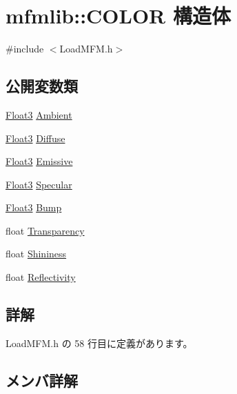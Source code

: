 \hypertarget{structmfmlib_1_1_c_o_l_o_r}{}\section{mfmlib\+:\+:C\+O\+L\+OR 構造体}
\label{structmfmlib_1_1_c_o_l_o_r}


{\ttfamily \#include $<$Load\+M\+F\+M.\+h$>$}

\subsection*{公開変数類}
\begin{DoxyCompactItemize}
\item 
\mbox{\hyperlink{structmfmlib_1_1_float3}{Float3}} \mbox{\hyperlink{structmfmlib_1_1_c_o_l_o_r_a66a6ab53ba9f59038bb853b5cb2bcee3}{Ambient}}
\item 
\mbox{\hyperlink{structmfmlib_1_1_float3}{Float3}} \mbox{\hyperlink{structmfmlib_1_1_c_o_l_o_r_a1c67c1a239b12b2896e07a19643ecf95}{Diffuse}}
\item 
\mbox{\hyperlink{structmfmlib_1_1_float3}{Float3}} \mbox{\hyperlink{structmfmlib_1_1_c_o_l_o_r_a179a172e0911c311ce7f5292f428897a}{Emissive}}
\item 
\mbox{\hyperlink{structmfmlib_1_1_float3}{Float3}} \mbox{\hyperlink{structmfmlib_1_1_c_o_l_o_r_a6f8590c510c471fb9bfe748c113d86d0}{Specular}}
\item 
\mbox{\hyperlink{structmfmlib_1_1_float3}{Float3}} \mbox{\hyperlink{structmfmlib_1_1_c_o_l_o_r_ac6c7c91adc2d4fafe3ac020ff75c871f}{Bump}}
\item 
float \mbox{\hyperlink{structmfmlib_1_1_c_o_l_o_r_a5b50ad6ab93f151be8466ce16ac59e97}{Transparency}}
\item 
float \mbox{\hyperlink{structmfmlib_1_1_c_o_l_o_r_ae5cd2d46dcc9798ded9ecc7f3617bc40}{Shininess}}
\item 
float \mbox{\hyperlink{structmfmlib_1_1_c_o_l_o_r_a3df7017bc9d137c037452cc338fb2b66}{Reflectivity}}
\end{DoxyCompactItemize}


\subsection{詳解}


 Load\+M\+F\+M.\+h の 58 行目に定義があります。



\subsection{メンバ詳解}
\mbox{\label{structmfmlib_1_1_c_o_l_o_r_a66a6ab53ba9f59038bb853b5cb2bcee3}} 
